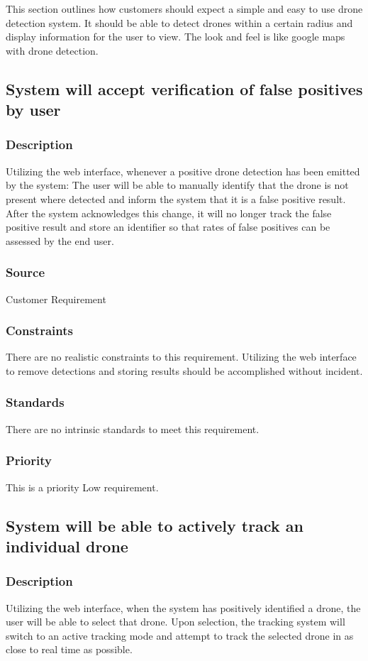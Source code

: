 This section outlines how customers should expect a simple and easy to use drone detection system.  It should be able to detect drones within a certain radius and display information for the user to view.  The look and feel is like google maps with drone detection.

\subsection{System will accept verification of false positives by user}
\subsubsection{Description}
Utilizing the web interface, whenever a positive drone detection has been emitted by the system: The user will be able to manually identify that the drone is not present where detected and inform the system that it is a false positive result. After the system acknowledges this change, it will no longer track the false positive result and store an identifier so that rates of false positives can be assessed by the end user.
\subsubsection{Source}
Customer Requirement
\subsubsection{Constraints}
There are no realistic constraints to this requirement. Utilizing the web interface to remove detections and storing results should be accomplished without incident.
\subsubsection{Standards}
There are no intrinsic standards to meet this requirement.
\subsubsection{Priority}
This is a priority Low requirement.

\subsection{System will be able to actively track an individual drone}
\subsubsection{Description}
Utilizing the web interface, when the system has positively identified a drone, the user will be able to select that drone. Upon selection, the tracking system will switch to an active tracking mode and attempt to track the selected drone in as close to real time as possible.
